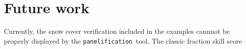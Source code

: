 \documentclass[11pt,a4paper]{article}
\newcommand{\panels}{\texttt{panelification }}
\begin{document}
\section{Future work}
Currently, the snow cover verification included in the examples cannnot be properly displayed by the 
\panels tool. The classic fraction skill score






\end{document}
